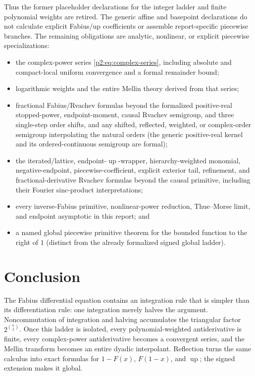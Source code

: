 \documentclass[11pt,oneside]{article}
\theoremstyle{definition}
\theoremstyle{remark}
\newcommand{\Up}{\operatorname{up}}
\newcommand{\1}{\mathbf 1}
\begin{document}
Thus the former placeholder declarations for the integer ladder and finite
polynomial weights are retired.  The generic affine and basepoint declarations
do not calculate explicit Fabius/up coefficients or assemble report-specific
piecewise branches.  The remaining obligations are analytic, nonlinear, or
explicit piecewise specializations:
\begin{itemize}
\item the complex-power series \eqref{p2:eq:complex-series}, including absolute
and compact-local uniform convergence and a formal remainder bound;
\item logarithmic weights and the entire Mellin theory derived from that
series;
\item fractional Fabius/Rvachev formulas beyond the formalized positive-real stopped-power,
endpoint-moment, causal Rvachev semigroup, and three single-step order shifts, and any
shifted, reflected, weighted, or complex-order semigroup interpolating the natural orders
(the generic positive-real kernel and its ordered-continuous semigroup are formal);
\item the iterated/lattice, endpoint-\(\Up\)-wrapper, hierarchy-weighted monomial,
negative-endpoint, piecewise-coefficient, explicit exterior tail, refinement, and
fractional-derivative Rvachev formulas beyond the causal primitive, including their Fourier
sinc-product interpretations;
\item every inverse-Fabius primitive, nonlinear-power reduction, Thue--Morse
limit, and endpoint asymptotic in this report; and
\item a named global piecewise primitive theorem for the bounded function to
the right of $1$ (distinct from the already formalized signed global ladder).
\end{itemize}

\section{Conclusion}
\label{p2:sec:conclusion}

The Fabius differential equation contains an integration rule that is simpler
than its differentiation rule: one integration merely halves the argument.
Noncommutation of integration and halving accumulates the triangular factor
$2^{\binom n2}$.  Once this ladder is isolated, every polynomial-weighted
antiderivative is finite, every complex-power antiderivative becomes a
convergent series, and the Mellin transform becomes an entire dyadic
interpolant.  Reflection turns the same calculus into exact formulas for
$1-F(x)$, $F(1-x)$, and $\Up$; the signed extension makes it global.
\end{document}

